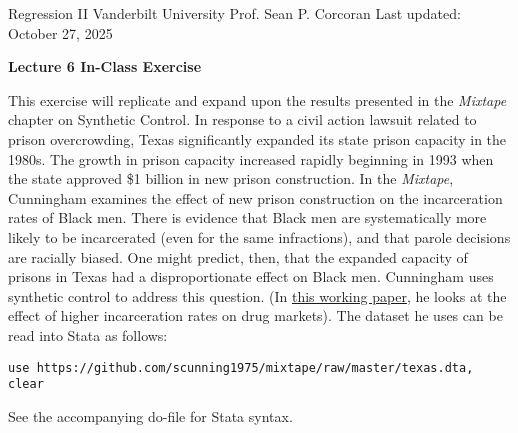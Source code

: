 \documentclass[12pt]{article}
\newlength{\toppush}
\newcommand{\htitle}[3]{\noindent\vspace*{-\toppush}\newline\parbox{6.5in}
   {Regression II\hfill\newline
    Vanderbilt University    \hfill #2 \newline
    Prof. Sean P. Corcoran \hfill #3 \newline
    \mbox{}\hrulefill\mbox{}}\vspace*{0.4ex}\mbox{}\newline
    \begin{center}{\bf #1}\end{center}}
\newcommand{\handout}[3]{\thispagestyle{empty}
\pagestyle{myheadings}\htitle{#1}{#2}{#3}}
\begin{document}

\handout{Lecture 6 In-Class Exercise}{}{Last updated: October 27, 2025}
\setlength{\parindent}{0pt}

\hrulefill
\bigskip

\bigskip

This exercise will replicate and expand upon the results presented in the \textit{Mixtape} chapter on Synthetic Control. In response to a civil action lawsuit related to prison overcrowding, Texas significantly expanded its state prison capacity in the 1980s. The growth in prison capacity increased rapidly beginning in 1993 when the state approved \$1 billion in new prison construction. In the \textit{Mixtape}, Cunningham examines the effect of new prison construction on the incarceration rates of Black men. There is evidence that Black men are systematically more likely to be incarcerated (even for the same infractions), and that parole decisions are racially biased. One might predict, then, that the expanded capacity of prisons in Texas had a disproportionate effect on Black men. Cunningham uses synthetic control to address this question. (In \href{www.scunning.com/files/mass_incarceration_and_drug_abuse.pdf}{this working paper}, he looks at the effect of higher incarceration rates on drug markets). The dataset he uses can be read into Stata as follows:
\bigskip

\texttt{use https://github.com/scunning1975/mixtape/raw/master/texas.dta, clear}
\bigskip

See the accompanying do-file for Stata syntax.
\end{document}
